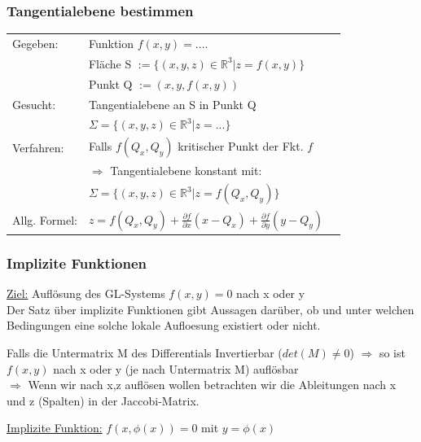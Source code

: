 \documentclass[6pt]{article}
\begin{document}
\begin{multicols*}{3}
	
	\subsubsection*{Tangentialebene bestimmen}
		\begin{tabular}{lll}
		Gegeben: 		&	Funktion $f(x,y) = ....$ \\
							&	Fl{\"a}che S $:= \{ (x,y,z)  \in \mathbb{R}^3 | z=f(x,y) \}$ \\
							&  Punkt Q $:= (x, y, f(x,y))$ \vspace{1mm}\\
		Gesucht:		& Tangentialebene an S in Punkt Q \\
							& $\Sigma = \{  (x,y,z) \in \mathbb{R}^3 | z = ... \}$ \vspace{1mm}\\
		Verfahren: 	& Falls $f(Q_x,Q_y)$ kritischer Punkt der Fkt. $f$ \\
							& $\Rightarrow$ Tangentialebene konstant mit: \\
							& $\Sigma = \{  (x,y,z) \in \mathbb{R}^3 | z = f(Q_x,Q_y) \}$ \vspace{3mm}\\
		Allg. Formel: & $z = f(Q_x,Q_y) + \frac{\partial f}{\partial x} (x - Q_x) + \frac{\partial f}{\partial y} (y - 					Q_y) $ \\				 
		\end{tabular}
	
	
	
	\subsubsection*{Implizite Funktionen}
		\underline{Ziel:} Aufl{\"o}sung des GL-Systems $f(x,y) = 0$ nach x oder y \\
		
		Der Satz {\"u}ber implizite Funktionen gibt Aussagen dar{\"u}ber, ob und unter welchen Bedingungen eine solche lokale Aufloesung existiert oder nicht.
		
		Falls die Untermatrix M des Differentials Invertierbar ($det(M) \not = 0$)  $\Rightarrow $ so ist $f(x,y)$ nach x oder y (je nach Untermatrix M) aufl{\"o}sbar  \\
		$\Rightarrow$ Wenn wir nach x,z aufl{\"o}sen wollen betrachten wir die Ableitungen nach x und z (Spalten) in der Jaccobi-Matrix.
		
		
		\vspace{4mm}
		\underline{Implizite Funktion:}	\quad $f(x,\phi(x))=0$ \quad mit $y=\phi(x)$
		

\end{multicols*}
\end{document}
